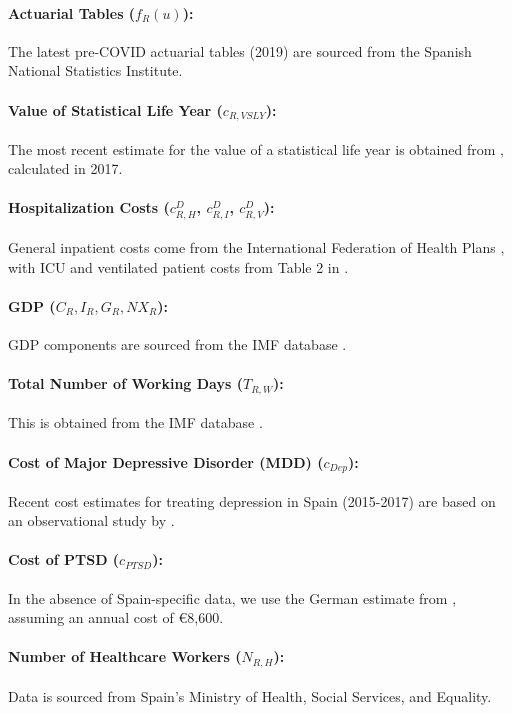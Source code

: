 \documentclass[msom,blindrev]{informs3} %
\begin{document}
\begin{APPENDICES}
\paragraph{Actuarial Tables ($f_R(u)$):} The latest pre-COVID actuarial tables (2019) are sourced from the Spanish National Statistics Institute.
\paragraph{Value of Statistical Life Year ($c_{R,VSLY}$):} The most recent estimate for the value of a statistical life year is obtained from , calculated in 2017.
\paragraph{Hospitalization Costs ($c^D_{R,H}$, $c^D_{R,I}$, $c^D_{R,V}$):} General inpatient costs come from the International Federation of Health Plans \cite{iFHP}, with ICU and ventilated patient costs  from Table 2 in .
\paragraph{GDP ($C_R, I_R, G_R, NX_R$):} GDP components are sourced from the IMF database .

\paragraph{Total Number of Working Days ($T_{R,W}$):} This is obtained from the IMF database .
\paragraph{Cost of Major Depressive Disorder (MDD) ($c_{Dep}$):} Recent cost estimates for treating depression in Spain (2015-2017) are based on an observational study by .
\paragraph{Cost of PTSD ($c_{PTSD}$):} In the absence of Spain-specific data, we use the German estimate from , assuming an annual cost of \euro8,600.
\paragraph{Number of Healthcare Workers ($N_{R,H}$):} Data is sourced from Spain’s Ministry of Health, Social Services, and Equality.

\end{APPENDICES}
\end{document}
